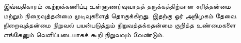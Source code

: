 \documentclass[../../../include/open-logic-chapter]{subfiles}
\begin{document}

\begin{editorial}
  இவ்வதிகாரம் கூற்றுக்கணிப்பு உள்ளுணர்வுவாதத் தருக்கத்திற்கான சரித்தன்மை
  மற்றும் நிறைவுத்தன்மை முடிவுகளைத் தொகுக்கிறது. இதற்கு ஓர் அறிமுகம் தேவை.
  நிறைவுத்தன்மை நிறுவல் பயன்படுத்தும் நிறுவத்தக்கதன்மை குறித்த உண்மைகளை
  எங்கேனும் வெளிப்படையாகக் கூறி நிறுவவும் வேண்டும்.
\end{editorial}


\OLEndChapterHook
\end{document}
